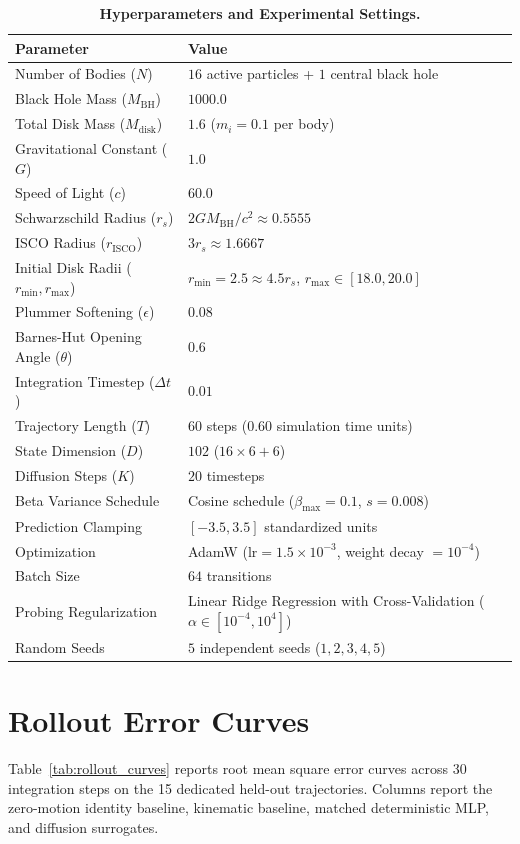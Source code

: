 \documentclass[11pt,a4paper]{article}
\begin{document}
\begin{table}[H]
\centering
\small
\caption{\textbf{Hyperparameters and Experimental Settings.}}
\label{tab:hyperparameters}
\begin{tabular}{ll}
\toprule
\textbf{Parameter} & \textbf{Value} \\
\midrule
Number of Bodies ($N$) & $16$ active particles + $1$ central black hole \\
Black Hole Mass ($M_{\mathrm{BH}}$) & $1000.0$ \\
Total Disk Mass ($M_{\mathrm{disk}}$) & $1.6$ ($m_i = 0.1$ per body) \\
Gravitational Constant ($G$) & $1.0$ \\
Speed of Light ($c$) & $60.0$ \\
Schwarzschild Radius ($r_s$) & $2GM_{\mathrm{BH}}/c^2 \approx 0.5555$ \\
ISCO Radius ($r_{\mathrm{ISCO}}$) & $3r_s \approx 1.6667$ \\
Initial Disk Radii ($r_{\min}, r_{\max}$) & $r_{\min} = 2.5 \approx 4.5 r_s$, $r_{\max} \in [18.0, 20.0]$ \\
Plummer Softening ($\epsilon$) & $0.08$ \\
Barnes-Hut Opening Angle ($\theta$) & $0.6$ \\
Integration Timestep ($\Delta t$) & $0.01$ \\
Trajectory Length ($T$) & $60$ steps ($0.60$ simulation time units) \\
\midrule
State Dimension ($D$) & $102$ ($16 \times 6 + 6$) \\
Diffusion Steps ($K$) & $20$ timesteps \\
Beta Variance Schedule & Cosine schedule ($\beta_{\max} = 0.1$, $s = 0.008$) \cite{nichol2021improved} \\
Prediction Clamping & $[-3.5, 3.5]$ standardized units \\
Optimization & AdamW ($\mathrm{lr} = 1.5 \times 10^{-3}$, weight decay $= 10^{-4}$) \\
Batch Size & $64$ transitions \\
Probing Regularization & Linear Ridge Regression with Cross-Validation ($\alpha \in [10^{-4}, 10^4]$) \\
Random Seeds & $5$ independent seeds ($1, 2, 3, 4, 5$) \\
\bottomrule
\end{tabular}
\end{table}

\section{Rollout Error Curves}
Table~\ref{tab:rollout_curves} reports root mean square error curves across 30 integration steps on the 15 dedicated held-out trajectories. Columns report the zero-motion identity baseline, kinematic baseline, matched deterministic MLP, and diffusion surrogates.
\end{document}
